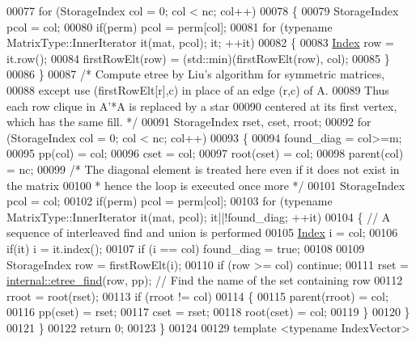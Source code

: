 \begin{DoxyCode}
00077   \textcolor{keywordflow}{for} (StorageIndex col = 0; col < nc; col++)
00078   \{
00079     StorageIndex pcol = col;
00080     \textcolor{keywordflow}{if}(perm) pcol  = perm[col];
00081     \textcolor{keywordflow}{for} (\textcolor{keyword}{typename} MatrixType::InnerIterator it(mat, pcol); it; ++it)
00082     \{ 
00083       \hyperlink{namespace_eigen_a62e77e0933482dafde8fe197d9a2cfde}{Index} row = it.row();
00084       firstRowElt(row) = (std::min)(firstRowElt(row), col);
00085     \}
00086   \}
00087   \textcolor{comment}{/* Compute etree by Liu's algorithm for symmetric matrices,}
00088 \textcolor{comment}{          except use (firstRowElt[r],c) in place of an edge (r,c) of A.}
00089 \textcolor{comment}{    Thus each row clique in A'*A is replaced by a star}
00090 \textcolor{comment}{    centered at its first vertex, which has the same fill. */}
00091   StorageIndex rset, cset, rroot;
00092   \textcolor{keywordflow}{for} (StorageIndex col = 0; col < nc; col++) 
00093   \{
00094     found\_diag = col>=m;
00095     pp(col) = col; 
00096     cset = col; 
00097     root(cset) = col; 
00098     parent(col) = nc; 
00099     \textcolor{comment}{/* The diagonal element is treated here even if it does not exist in the matrix}
00100 \textcolor{comment}{     * hence the loop is executed once more */} 
00101     StorageIndex pcol = col;
00102     \textcolor{keywordflow}{if}(perm) pcol  = perm[col];
00103     \textcolor{keywordflow}{for} (\textcolor{keyword}{typename} MatrixType::InnerIterator it(mat, pcol); it||!found\_diag; ++it)
00104     \{ \textcolor{comment}{//  A sequence of interleaved find and union is performed }
00105       \hyperlink{namespace_eigen_a62e77e0933482dafde8fe197d9a2cfde}{Index} i = col;
00106       \textcolor{keywordflow}{if}(it) i = it.index();
00107       \textcolor{keywordflow}{if} (i == col) found\_diag = \textcolor{keyword}{true};
00108       
00109       StorageIndex row = firstRowElt(i);
00110       \textcolor{keywordflow}{if} (row >= col) \textcolor{keywordflow}{continue}; 
00111       rset = \hyperlink{namespace_eigen_1_1internal_af1daa938f6414254cc9a754f1ef2490b}{internal::etree\_find}(row, pp); \textcolor{comment}{// Find the name of the set containing row}
00112       rroot = root(rset);
00113       \textcolor{keywordflow}{if} (rroot != col) 
00114       \{
00115         parent(rroot) = col; 
00116         pp(cset) = rset; 
00117         cset = rset; 
00118         root(cset) = col; 
00119       \}
00120     \}
00121   \}
00122   \textcolor{keywordflow}{return} 0;  
00123 \}
00124 
00129 \textcolor{keyword}{template} <\textcolor{keyword}{typename} IndexVector>

\end{DoxyCode}
